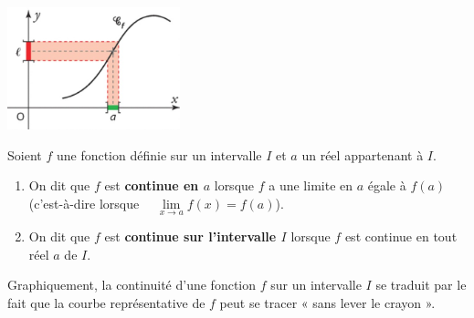 \documentclass[a4paper,11pt,cours]{nsi} %
\begin{document}
\begin{definition}
	{\includegraphics[width=5cm]{limite5.jpg}}
\end{definition}

\begin{definition}[s]
	Soient $f$ une fonction définie sur un intervalle $I$ et $a$ un réel appartenant à $I$.
	\begin{enumerate}[label=\textbullet]
		\item On dit que $f$ est \textbf{continue en $a$} lorsque $f$ a une limite en $a$ égale à $f(a)$ (c'est-à-dire lorsque $ \quad \lim\limits_{x\to a} f(x)=f(a)$).
		\item On dit que $f$ est \textbf{continue sur l'intervalle $I$} lorsque $f$ est continue en tout réel $a$ de $I$.
	\end{enumerate}
\end{definition}

\begin{remarque}[]
	Graphiquement, la continuité d'une fonction $f$ sur un intervalle $I$ se traduit par le fait que la courbe représentative de $f$ peut se tracer « sans lever le crayon ».
\end{remarque}


\setlength{\columnseprule}{0.5pt}
\setlength{\columnsep}{1cm}
\end{document}
